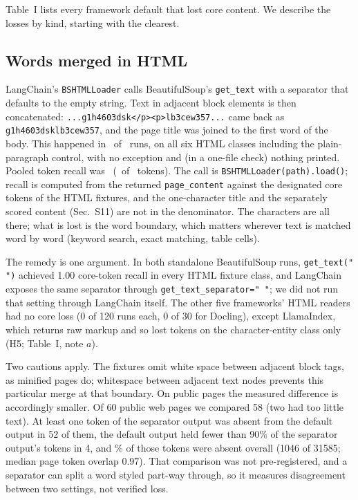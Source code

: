 \documentclass[aps,pre,twocolumn,superscriptaddress,nofootinbib,10pt]{revtex4-2}
\begin{document}
Table~I lists every framework default that lost core content. We describe the losses by kind, starting with the clearest.

\subsection{Words merged in HTML}
LangChain's \texttt{BSHTMLLoader} calls BeautifulSoup's \texttt{get\_text} with a separator that defaults to the empty string. Text in adjacent block elements is then concatenated: \texttt{...g1h4603dsk</p><p>lb3cew357...} came back as \texttt{g1h4603dsklb3cew357}, and the page title was joined to the first word of the body. This happened in \lcHtmlSilent\ of \lcHtmlRuns\ runs, on all six HTML classes including the plain-paragraph control, with no exception and (in a one-file check) nothing printed. Pooled token recall was \lcHtmlRecall\ (\lcHtmlFound\ of \lcHtmlTotal\ tokens). The call is \texttt{BSHTMLLoader(path).load()}; recall is computed from the returned \texttt{page\_content} against the designated core tokens of the HTML fixtures, and the one-character title and the separately scored content (Sec.~S11) are not in the denominator. The characters are all there; what is lost is the word boundary, which matters wherever text is matched word by word (keyword search, exact matching, table cells).

The remedy is one argument. In both standalone BeautifulSoup runs, \texttt{get\_text(" ")} achieved 1.00 core-token recall in every HTML fixture class, and LangChain exposes the same separator through \texttt{get\_text\_separator=" "}; we did not run that setting through LangChain itself. The other five frameworks' HTML readers had no core loss (0 of 120 runs each, 0 of 30 for Docling), except LlamaIndex, which returns raw markup and so lost tokens on the character-entity class only (H5; Table~I, note $a$).

Two cautions apply. The fixtures omit white space between adjacent block tags, as minified pages do; whitespace between adjacent text nodes prevents this particular merge at that boundary. On public pages the measured difference is accordingly smaller. Of 60 public web pages we compared 58 (two had too little text). At least one token of the separator output was absent from the default output in 52 of them, the default output held fewer than 90\% of the separator output's tokens in 4, and \glueRealPct\% of those tokens were absent overall (1046 of 31585; median page token overlap 0.97). That comparison was not pre-registered, and a separator can split a word styled part-way through, so it measures disagreement between two settings, not verified loss.
\end{document}

